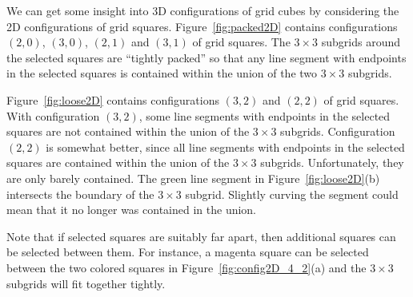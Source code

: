 We can get some insight into 3D configurations of grid cubes
by considering the 2D configurations of grid squares.
Figure~\ref{fig:packed2D} contains configurations $(2,0)$, $(3,0)$,
$(2,1)$ and $(3,1)$ of grid squares.
The $3 \times 3$ subgrids around the selected squares are ``tightly packed''
so that any line segment with endpoints in the selected squares
is contained within the union of the two $3 \times 3$ subgrids.

Figure~\ref{fig:loose2D} contains configurations $(3,2)$ and $(2,2)$
of grid squares.
With configuration $(3,2)$, some line segments with endpoints
in the selected squares are not contained within the union
of the $3 \times 3$ subgrids.
Configuration $(2,2)$ is somewhat better,
since all line segments with endpoints in the selected squares
are contained within the union of the $3 \times 3$ subgrids.
Unfortunately, they are only barely contained.
The green line segment in Figure~\ref{fig:loose2D}(b) intersects
the boundary of the $3 \times 3$ subgrid.
Slightly curving the segment could mean that it no longer was contained
in the union.

Note that if selected squares are suitably far apart,
then additional squares can be selected between them.
For instance, a magenta square can be selected between the two colored squares
in Figure~\ref{fig:config2D_4_2}(a) and the $3 \times 3$ subgrids
will fit together tightly.


